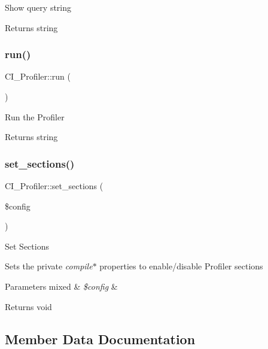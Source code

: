 Show query string

\begin{DoxyReturn}{Returns}
string 
\end{DoxyReturn}
\mbox{\label{class_c_i___profiler_a3eff5c3886017189aa6a42a6c0de851f}} 
\subsubsection{\texorpdfstring{run()}{run()}}
{\footnotesize\ttfamily C\+I\+\_\+\+Profiler\+::run (\begin{DoxyParamCaption}{ }\end{DoxyParamCaption})}

Run the Profiler

\begin{DoxyReturn}{Returns}
string 
\end{DoxyReturn}
\mbox{\label{class_c_i___profiler_afce81059c9f8e319e88d199666e15c14}} 
\subsubsection{\texorpdfstring{set\+\_\+sections()}{set\_sections()}}
{\footnotesize\ttfamily C\+I\+\_\+\+Profiler\+::set\+\_\+sections (\begin{DoxyParamCaption}\item[{}]{\$config }\end{DoxyParamCaption})}

Set Sections

Sets the private {\itshape compile}$\ast$ properties to enable/disable Profiler sections


\begin{DoxyParams}[1]{Parameters}
mixed & {\em \$config} & \\
\hline
\end{DoxyParams}
\begin{DoxyReturn}{Returns}
void 
\end{DoxyReturn}


\subsection{Member Data Documentation}
\mbox{\label{class_c_i___profiler_a7493e9e62be8ec5f6ce3dbef68cf6594}} 
